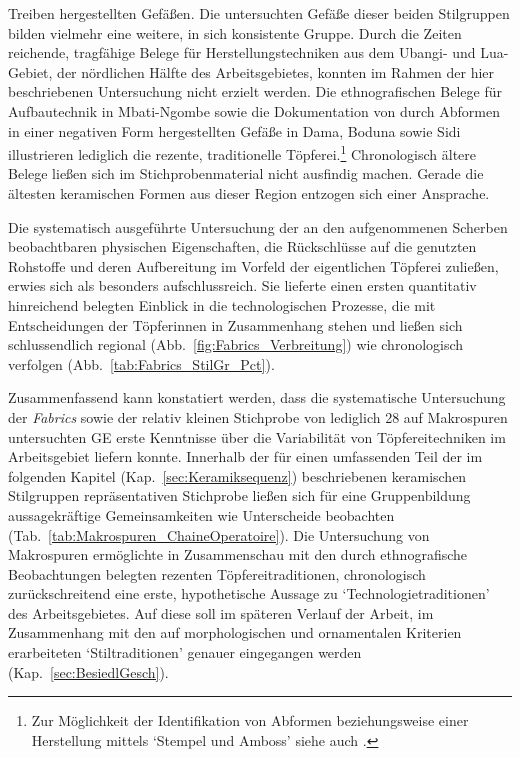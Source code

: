 Treiben hergestellten Gefäßen. Die untersuchten Gefäße dieser beiden Stilgruppen bilden vielmehr eine weitere, in sich konsistente Gruppe. Durch die Zeiten reichende, tragfähige Belege für Herstellungstechniken aus dem Ubangi- und Lua-Gebiet, der nördlichen Hälfte des Arbeitsgebietes, konnten im Rahmen der hier beschriebenen Untersuchung nicht erzielt werden. Die ethnografischen Belege für Aufbautechnik in Mbati-Ngombe sowie die Dokumentation von durch Abformen in einer negativen Form hergestellten Gefäße in Dama, Boduna sowie Sidi illustrieren lediglich die rezente, traditionelle Töpferei.\footnote{Zur Möglichkeit der Identifikation von Abformen beziehungsweise einer Herstellung mittels \enquote*{Stempel und Amboss} siehe auch \textcite{Martineau.2005}.} Chronologisch ältere Belege ließen sich im Stichprobenmaterial nicht ausfindig machen. Gerade die ältesten keramischen Formen aus dieser Region entzogen sich einer Ansprache.

Die systematisch ausgeführte Untersuchung der an den aufgenommenen Scherben beobachtbaren physischen Eigenschaften, die Rückschlüsse auf die genutzten Rohstoffe und deren Aufbereitung im Vorfeld der eigentlichen Töpferei zuließen, erwies sich als besonders aufschlussreich. Sie lieferte einen ersten quantitativ hinreichend belegten Einblick in die technologischen Prozesse, die mit Entscheidungen der Töpferinnen in Zusammenhang stehen und ließen sich schlussendlich regional (Abb.~\ref{fig:Fabrics_Verbreitung}) wie chronologisch verfolgen (Abb.~\ref{tab:Fabrics_StilGr_Pct}).

Zusammenfassend kann konstatiert werden, dass die systematische Untersuchung der \textit{Fabrics} sowie der relativ kleinen Stichprobe von lediglich 28 auf Makrospuren untersuchten GE erste Kenntnisse über die Variabilität von Töpfereitechniken im Arbeitsgebiet liefern konnte. Innerhalb der für einen umfassenden Teil der im folgenden Kapitel (Kap.~\ref{sec:Keramiksequenz}) beschriebenen keramischen Stilgruppen repräsentativen Stichprobe ließen sich für eine Gruppenbildung aussagekräftige Gemeinsamkeiten wie Unterscheide beobachten (Tab.~\ref{tab:Makrospuren_ChaineOperatoire}). Die Untersuchung von Makrospuren ermöglichte in Zusammenschau mit den durch ethnografische Beobachtungen belegten rezenten Töpfereitraditionen, chronologisch zurückschreitend eine erste, hypothetische Aussage zu \enquote*{Technologietraditionen} des Arbeitsgebietes. Auf diese soll im späteren Verlauf der Arbeit, im Zusammenhang mit den auf morphologischen und ornamentalen Kriterien erarbeiteten \enquote*{Stiltraditionen} genauer eingegangen werden (Kap.~\ref{sec:BesiedlGesch}).